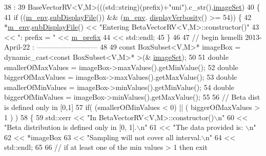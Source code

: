 \begin{DoxyCode}
38   :
39   BaseVectorRV<V,M>(((std::string)(prefix)+\textcolor{stringliteral}{"uni"}).c\_str(),\hyperlink{class_q_u_e_s_o_1_1_base_vector_r_v_aa4dd2f036228eac1f945bacc7147a922}{imageSet})
40 \{
41   \textcolor{keywordflow}{if} ((\hyperlink{class_q_u_e_s_o_1_1_base_vector_r_v_a556761c50e2d171977ef5f19a63c8c73}{m\_env}.\hyperlink{class_q_u_e_s_o_1_1_base_environment_a8a0064746ae8dddfece4229b9ad374d6}{subDisplayFile}()) && (\hyperlink{class_q_u_e_s_o_1_1_base_vector_r_v_a556761c50e2d171977ef5f19a63c8c73}{m\_env}.
      \hyperlink{class_q_u_e_s_o_1_1_base_environment_a1fe5f244fc0316a0ab3e37463f108b96}{displayVerbosity}() >= 54)) \{
42     *\hyperlink{class_q_u_e_s_o_1_1_base_vector_r_v_a556761c50e2d171977ef5f19a63c8c73}{m\_env}.\hyperlink{class_q_u_e_s_o_1_1_base_environment_a8a0064746ae8dddfece4229b9ad374d6}{subDisplayFile}() << \textcolor{stringliteral}{"Entering BetaVectorRV<V,M>::constructor()"}
43                             << \textcolor{stringliteral}{": prefix = "} << \hyperlink{class_q_u_e_s_o_1_1_base_vector_r_v_a030ce3bc9873a9eaf6d8bf452c096ab3}{m\_prefix}
44                             << std::endl;
45   \}
46 
47 \textcolor{comment}{// begin kemelli 2013-April-22 : --------------------------}
48 
49   \textcolor{keyword}{const} BoxSubset<V,M>* imageBox = \textcolor{keyword}{dynamic\_cast<}\textcolor{keyword}{const }BoxSubset<V,M>* \textcolor{keyword}{>}(&
      \hyperlink{class_q_u_e_s_o_1_1_base_vector_r_v_aa4dd2f036228eac1f945bacc7147a922}{imageSet});
50 
51   \textcolor{keywordtype}{double} smallerOfMaxValues = imageBox->maxValues().getMinValue();      
52   \textcolor{keywordtype}{double} biggerOfMaxValues = imageBox->maxValues().getMaxValue();       
53   \textcolor{keywordtype}{double} smallerOfMinValues = imageBox->minValues().getMinValue();
54   \textcolor{keywordtype}{double} biggerOfMinValues = imageBox->minValues().getMaxValue();       
55   
56  \textcolor{comment}{// Beta dist is defined only in [0,1]          }
57  \textcolor{keywordflow}{if}( (smallerOfMinValues < 0) || ( biggerOfMaxValues > 1 ) ) 
58  \{              
59    std::cerr << \textcolor{stringliteral}{"In BetaVectorRV<V,M>::constructor()\(\backslash\)n"} 
60        << \textcolor{stringliteral}{"Beta distribution is defined only in [0, 1].\(\backslash\)n"}
61        << \textcolor{stringliteral}{"The data provided is: \(\backslash\)n"}
62        << *imageBox 
63          << \textcolor{stringliteral}{"Sampling will not cover all interval.\(\backslash\)n"}   
64          << std::endl;
65 
66  \textcolor{comment}{// if at least one of the min values > 1 then exit}

\end{DoxyCode}
